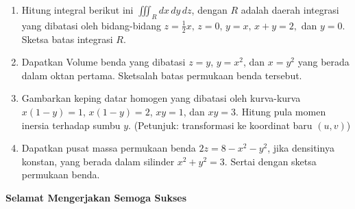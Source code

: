 \documentclass[11pt,a4paper]{article}
\begin{document}
\begin{enumerate}
  \item Hitung integral berikut ini $\iiint_R dx\,dy\,dz$, dengan $R$ adalah daerah integrasi yang dibatasi oleh bidang-bidang $z=\frac{1}{2}x,\, z=0,\, y=x,\, x+y=2,$ dan $y=0$. Sketsa batas integrasi $R$.
  \item Dapatkan Volume benda yang dibatasi $z=y$, $y=x^2$, dan $x=y^2$ yang berada dalam oktan pertama. Sketsalah batas permukaan benda tersebut.
  \item Gambarkan keping datar homogen yang dibatasi oleh kurva-kurva $x(1-y)=1$, $x(1-y)=2$, $xy=1$, dan $xy=3$. Hitung pula momen inersia terhadap sumbu $y$. (Petunjuk: transformasi ke koordinat baru $(u,v)$)
  \item Dapatkan pusat massa permukaan benda $2z=8-x^2-y^2$, jika densitinya konstan, yang berada dalam silinder $x^2+y^2=3$. Sertai dengan sketsa permukaan benda.
\end{enumerate}
\vspace*{1cm}
\begin{center}
  \textbf{Selamat Mengerjakan Semoga Sukses}
\end{center}
\end{document}
